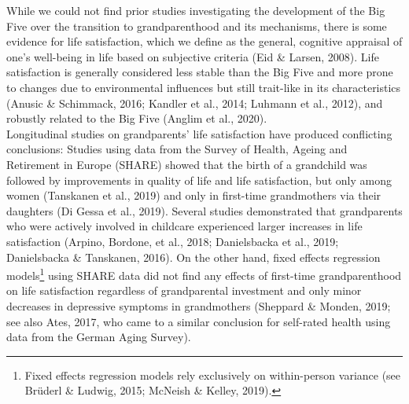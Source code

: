 \documentclass[
  english,
  man,floatsintext]{apa7}
\begin{document}
While we could not find prior studies investigating the development of the Big Five over the transition to grandparenthood and its mechanisms, there is some evidence for life satisfaction, which we define as the general, cognitive appraisal of one's well-being in life based on subjective criteria (Eid \& Larsen, 2008). Life satisfaction is generally considered less stable than the Big Five and more prone to changes due to environmental influences but still trait-like in its characteristics (Anusic \& Schimmack, 2016; Kandler et al., 2014; Luhmann et al., 2012), and robustly related to the Big Five (Anglim et al., 2020).\\
Longitudinal studies on grandparents' life satisfaction have produced conflicting conclusions: Studies using data from the Survey of Health, Ageing and Retirement in Europe (SHARE) showed that the birth of a grandchild was followed by improvements in quality of life and life satisfaction, but only among women (Tanskanen et al., 2019) and only in first-time grandmothers via their daughters (Di Gessa et al., 2019). Several studies demonstrated that grandparents who were actively involved in childcare experienced larger increases in life satisfaction (Arpino, Bordone, et al., 2018; Danielsbacka et al., 2019; Danielsbacka \& Tanskanen, 2016). On the other hand, fixed effects regression models\footnote{Fixed effects regression models rely exclusively on within-person variance (see Brüderl \& Ludwig, 2015; McNeish \& Kelley, 2019).} using SHARE data did not find any effects of first-time grandparenthood on life satisfaction regardless of grandparental investment and only minor decreases in depressive symptoms in grandmothers (Sheppard \& Monden, 2019; see also Ates, 2017, who came to a similar conclusion for self-rated health using data from the German Aging Survey).\\
\end{document}
